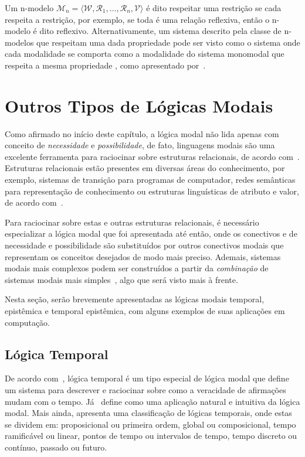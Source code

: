             Um n-modelo \({\mathcal{M}_n = \langle \mathcal{W}, \mathcal{R}_1,\dots,\mathcal{R}_n, \mathcal{V} \rangle}\) é dito respeitar uma restrição se cada 
            respeita a restrição, por exemplo, se toda  é uma relação reflexiva, então o n-modelo é dito reflexivo. Alternativamente, um sistema descrito pela
            classe de n-modelos que respeitam uma dada propriedade  pode ser visto como o sistema onde cada modalidade  se comporta como a modalidade \BOX do sistema monomodal
            que respeita a mesma propriedade , como apresentado por~.

    \section{Outros Tipos de Lógicas Modais}
        \label{sec:LM-OutrasModais}
        Como afirmado no início deste capítulo, a lógica modal não lida apenas com conceito de \textit{necessidade} e \textit{possibilidade},
        de fato, linguagens modais são uma excelente ferramenta para raciocinar sobre estruturas relacionais, de acordo com~.
        Estruturas relacionais estão presentes em diversas áreas do conhecimento, por exemplo, sistemas de transição para programas de computador,
        redes semânticas para representação de conhecimento ou estruturas linguísticas de atributo e valor, de acordo com~.

        Para raciocinar sobre estas e outras estruturas relacionais, é necessário especializar a lógica modal que foi apresentada até então, onde os conectivos
        \BOX e \DIA de necessidade e possibilidade são substituídos por outros conectivos modais que representam os conceitos desejados de modo mais preciso.
        Ademais, sistemas modais mais complexos podem ser construídos a partir da \textit{combinação} de sistemas modais mais simples~\cite{roggia2012fusion},
        algo que será visto mais à frente.

        Nesta seção, serão brevemente apresentadas as lógicas modais temporal, epistêmica e temporal epistêmica, com alguns exemplos de suas aplicações em computação.

        \subsection{Lógica Temporal}
            \label{subsec:LogicaTemporal}
            De acordo com~, lógica temporal é um tipo especial de lógica modal que define um sistema para descrever e raciocinar sobre
            como a veracidade de afirmações mudam com o tempo. Já~ define como uma aplicação natural e intuitiva da lógica modal. Mais ainda,
             apresenta uma classificação de lógicas temporais, onde estas se dividem em: proposicional ou primeira ordem, global ou composicional,
            tempo ramificável ou linear, pontos de tempo ou intervalos de tempo, tempo discreto ou contínuo, passado ou futuro.

